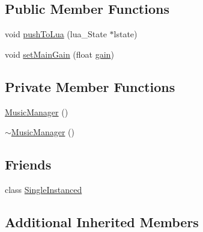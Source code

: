 \subsection*{Public Member Functions}
\begin{DoxyCompactItemize}
\item 
void \hyperlink{classZeta_1_1MusicManager_a1122a343faebeaadb193a14450586184}{push\+To\+Lua} (lua\+\_\+\+State $\ast$lstate)
\item 
void \hyperlink{classZeta_1_1MusicManager_a4c2193efbf9036ea55ada1672a26be43}{set\+Main\+Gain} (float \hyperlink{classZeta_1_1SoundInstance_acb82c5783574e56f82116574bea15e6d}{gain})
\end{DoxyCompactItemize}
\subsection*{Private Member Functions}
\begin{DoxyCompactItemize}
\item 
\hyperlink{classZeta_1_1MusicManager_adccef959cd30a1e4e4c4402903c9afda}{Music\+Manager} ()
\item 
\hyperlink{classZeta_1_1MusicManager_adb8c17f0b50dcb49a997ac5010a6b700}{$\sim$\+Music\+Manager} ()
\end{DoxyCompactItemize}
\subsection*{Friends}
\begin{DoxyCompactItemize}
\item 
class \hyperlink{classZeta_1_1MusicManager_a2fa95d69b32a77fffa4b730679a8b08c}{Single\+Instanced}
\end{DoxyCompactItemize}
\subsection*{Additional Inherited Members}


